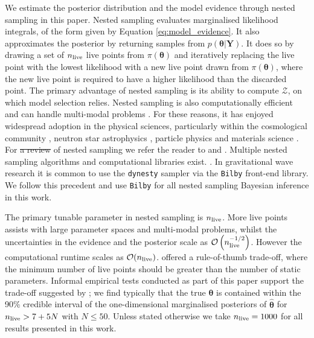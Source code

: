 \documentclass[fleqn,usenatbib,useAMS]{mnras}
\providecommand{\DIFadd}[1]{{\protect\color{blue}\uwave{#1}}} %
\providecommand{\DIFdel}[1]{{\protect\color{red}\sout{#1}}}                      %
\providecommand{\DIFaddbegin}{} %
\providecommand{\DIFaddend}{} %
\providecommand{\DIFdelbegin}{} %
\providecommand{\DIFdelend}{} %
\newcommand{\DIFscaledelfig}{0.5}
\newlength{\DIFdelgraphicswidth} %
\newlength{\DIFdelgraphicsheight} %
\newcommand{\DIFaddincludegraphics}[2][]{{\color{blue}\fbox{\DIFOincludegraphics[#1]{#2}}}} %
\newcommand{\DIFdelincludegraphics}[2][]{%
\sbox{\DIFdelgraphicsbox}{\DIFOincludegraphics[#1]{#2}}%
\settoboxwidth{\DIFdelgraphicswidth}{\DIFdelgraphicsbox} %
\settoboxtotalheight{\DIFdelgraphicsheight}{\DIFdelgraphicsbox} %
\scalebox{\DIFscaledelfig}{%
\parbox[b]{\DIFdelgraphicswidth}{\usebox{\DIFdelgraphicsbox}\\[-\baselineskip] \rule{\DIFdelgraphicswidth}{0em}}\llap{\resizebox{\DIFdelgraphicswidth}{\DIFdelgraphicsheight}{%
\setlength{\unitlength}{\DIFdelgraphicswidth}%
\begin{picture}(1,1)%
\thicklines\linethickness{2pt} %
{\color[rgb]{1,0,0}\put(0,0){\framebox(1,1){}}}%
{\color[rgb]{1,0,0}\put(0,0){\line( 1,1){1}}}%
{\color[rgb]{1,0,0}\put(0,1){\line(1,-1){1}}}%
\end{picture}%
}\hspace*{3pt}}} %
} %
\DeclareRobustCommand{\DIFaddbegin}{\DIFOaddbegin \let\includegraphics\DIFaddincludegraphics} %
\DeclareRobustCommand{\DIFaddend}{\DIFOaddend \let\includegraphics\DIFOincludegraphics} %
\DeclareRobustCommand{\DIFdelbegin}{\DIFOdelbegin \let\includegraphics\DIFdelincludegraphics} %
\DeclareRobustCommand{\DIFdelend}{\DIFOaddend \let\includegraphics\DIFOincludegraphics} %
\begin{document}
 We estimate the posterior distribution and the model evidence through nested sampling \citep{Skilling} in this paper. Nested sampling evaluates marginalised likelihood integrals, of the form given by Equation \eqref{eq:model_evidence}. It also approximates the posterior by returning samples from $p(\boldsymbol{\theta} | \boldsymbol{Y})$. It does so by drawing a set of $n_{\rm live}$ live points from $\pi(\boldsymbol{\theta})$ and iteratively replacing the live point with the lowest likelihood with a new live point drawn from $\pi(\boldsymbol{\theta})$, where the new live point is required to have a higher likelihood than the discarded point. The primary advantage of nested sampling is its ability to compute $\mathcal{Z}$, on which model selection relies. Nested sampling is also computationally efficient and can handle multi-modal problems \citep{Ashton2022}. For these reasons, it has enjoyed widespread adoption in the physical sciences, particularly within the cosmological community \citep{Mukherjee2006,Feroz2008,Handley2015}, neutron star astrophysics \citep{Myers2021MNRAS.502.3113M,Meyers2021,Melatos2023}, particle physics \citep{proceedings2019033014} and materials science \citep{2009arXiv0906materials}. For \DIFdelbegin \DIFdel{a review }\DIFdelend \DIFaddbegin \DIFadd{reviews }\DIFaddend of nested sampling we refer the reader to \cite{Buchner2021} and \cite{Ashton2022}. Multiple nested sampling algorithms and computational libraries exist. \citep[e.g.][]{Feroz2008,Feroz2009,Handley2015,dynesty2020,UltraNest2021}. In gravitational wave research it is common to use the \texttt{dynesty} sampler \citep{dynesty2020} via the \texttt{Bilby} \citep{bilby.507.2037A} front-end library. We follow this precedent and use \texttt{Bilby} for all nested sampling Bayesian inference in this work. \newline 

The primary tunable parameter in nested sampling is $n_{\rm live}$. More live points assists with large parameter spaces and multi-modal problems, whilst the uncertainties in the evidence and the posterior scale as $\mathcal{O}\left(n_{\rm live}^{-1/2}\right)$. However the computational runtime scales as $\mathcal{O}(n_{\rm live})$. \cite{Ashton2022} offered a rule-of-thumb trade-off, where the minimum number of live points should be greater than the number of static parameters. Informal empirical tests conducted as part of this paper support the trade-off suggested by \cite{Ashton2022}; we find typically that the true ${\boldsymbol{\theta}}$ is contained within the 90\% credible interval of the one-dimensional marginalised posteriors of ${\boldsymbol{\hat{\theta}}}$ for $n_{\rm live} > 7 + 5N$ with $N \leq 50$. Unless stated otherwise we take $n_{\rm live} = 1000$ for all results presented in this work. \newline 
\end{document}
